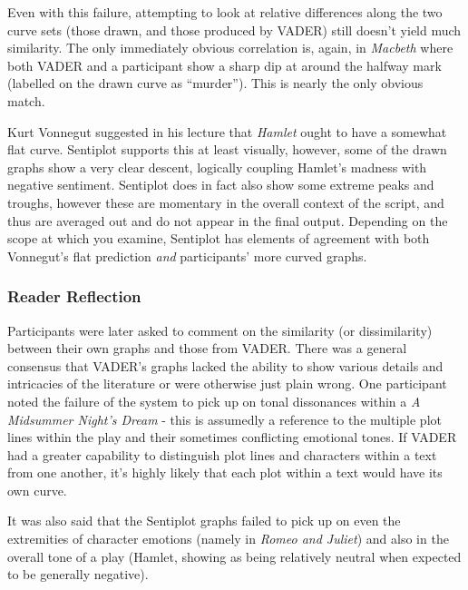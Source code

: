 \documentclass{article}
\begin{document}
{            Even with this failure, attempting to look at relative differences along the two curve sets (those drawn, and those produced by VADER) still doesn't yield much similarity. The only immediately obvious correlation is, again, in \textit{Macbeth} where both VADER and a participant show a sharp dip at around the halfway mark (labelled on the drawn curve as ``murder''). This is nearly the only obvious match.
            
            Kurt Vonnegut suggested in his lecture that \textit{Hamlet} ought to have a somewhat flat curve. Sentiplot supports this at least visually, however, some of the drawn graphs show a very clear descent, logically coupling Hamlet's madness with negative sentiment. Sentiplot does in fact also show some extreme peaks and troughs, however these are momentary in the overall context of the script, and thus are averaged out and do not appear in the final output. Depending on the scope at which you examine, Sentiplot has elements of agreement with both Vonnegut's flat prediction \textit{and} participants' more curved graphs.
			\subsubsection{Reader Reflection}
                Participants were later asked to comment on the similarity (or dissimilarity) between their own graphs and those from VADER. There was a general consensus that VADER's graphs lacked the ability to show various details and intricacies of the literature or were otherwise just plain wrong. 
                One participant noted the failure of the system to pick up on tonal dissonances within a \textit{A Midsummer Night's Dream} - this is assumedly a reference to the multiple plot lines within the play and their sometimes conflicting emotional tones. If VADER had a greater capability to distinguish plot lines and characters within a text from one another, it's highly likely that each plot within a text would have its own curve.
                
                It was also said that the Sentiplot graphs failed to pick up on even the extremities of character emotions (namely in \textit{Romeo and Juliet}) and also in the overall tone of a play (Hamlet, showing as being relatively neutral when expected to be generally negative).

}
\end{document}
